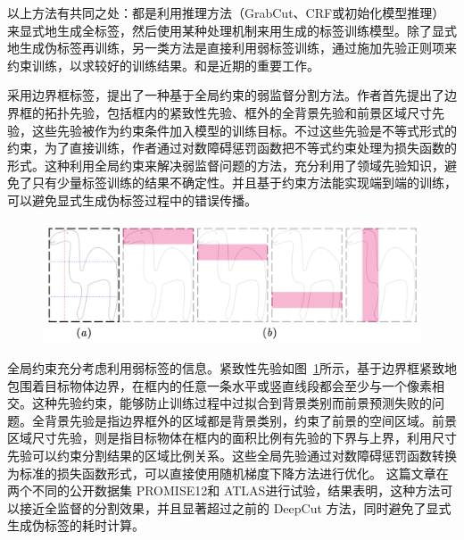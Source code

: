 以上方法有共同之处：都是利用推理方法（GrabCut、CRF或初始化模型推理）来显式地生成全标签，然后使用某种处理机制来用生成的标签训练模型。除了显式地生成伪标签再训练，另一类方法是直接利用弱标签训练，通过施加先验正则项来约束训练，以求较好的训练结果。\citet{kervadec2020bounding}和\citet{tang2018regularized}是近期的重要工作。

\citet{kervadec2020bounding} 采用边界框标签，提出了一种基于全局约束的弱监督分割方法。作者首先提出了边界框的拓扑先验，包括框内的紧致性先验、框外的全背景先验和前景区域尺寸先验，这些先验被作为约束条件加入模型的训练目标。不过这些先验是不等式形式的约束，为了直接训练，作者通过对数障碍惩罚函数把不等式约束处理为损失函数的形式。这种利用全局约束来解决弱监督问题的方法，充分利用了领域先验知识，避免了只有少量标签训练的结果不确定性。并且基于约束方法能实现端到端的训练，可以避免显式生成伪标签过程中的错误传播。
    \begin{figure}[tbp]
        \centering 
        \includegraphics[width=1.0\textwidth]{img/c2/rel_a6.png}
        \label{c2_fig6}
    \end{figure}
全局约束充分考虑利用弱标签的信息。紧致性先验如图~\ref{c2_fig6}所示，基于边界框紧致地包围着目标物体边界，在框内的任意一条水平或竖直线段都会至少与一个像素相交。这种先验约束，能够防止训练过程中过拟合到背景类别而前景预测失败的问题。全背景先验是指边界框外的区域都是背景类别，约束了前景的空间区域。前景区域尺寸先验，则是指目标物体在框内的面积比例有先验的下界与上界，利用尺寸先验可以约束分割结果的区域比例关系。这些全局先验通过对数障碍惩罚函数转换为标准的损失函数形式，可以直接使用随机梯度下降方法进行优化。
这篇文章在两个不同的公开数据集 PROMISE12\citep{Litjens2014EvaluationOP}和 ATLAS\citep{Liew2018ALO}进行试验，结果表明，这种方法可以接近全监督的分割效果，并且显著超过之前的 DeepCut 方法，同时避免了显式生成伪标签的耗时计算。

